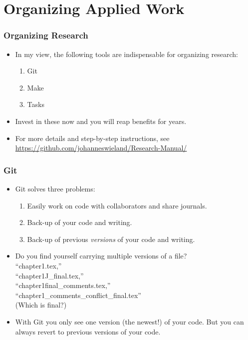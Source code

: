 \documentclass[english,xcolor=svgnames]{beamer}
\begin{document}
\section{Organizing Applied Work}

\begin{frame}
\frametitle[alignment=center]{Organizing Research}
\begin{itemize}
	\item In my view, the following tools are indispensable for organizing research: 
	\begin{enumerate}
	\item Git
	\item Make
	\item Tasks
\end{enumerate}
\item Invest in these now and you will reap benefits for years.
\item For more details and step-by-step instructions, see \href{https://github.com/johanneswieland/Research-Manual/}{https://github.com/johanneswieland/Research-Manual/}
\end{itemize}
\end{frame}


\begin{frame}
\frametitle[alignment=center]{Git}
\begin{itemize}
	\item Git solves three problems:
	\begin{enumerate}
		\item Easily work on code with collaborators and share journals.
		\item Back-up of your code and writing.
		\item Back-up of previous \emph{versions} of your code and writing.
	\end{enumerate}
	\item Do you find yourself carrying multiple versions of a file? \\ ``chapter1.tex,'' \\ ``chapter1J\_final.tex,''  \\ ``chapter1final\_comments.tex,'' \\ ``chapter1\_comments\_conflict\_final.tex''\\
	 (Which is final?)
	 \item With Git you only see one version (the newest!) of your code. But you can always revert to previous versions of your code.
\end{itemize}
\end{frame}
\end{document}
